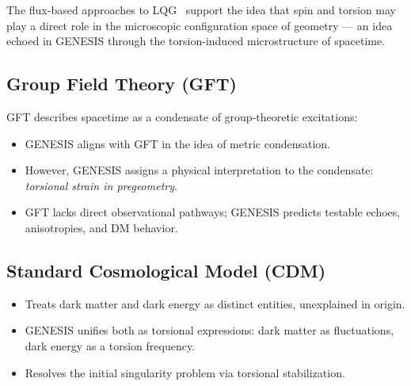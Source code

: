 \documentclass{article}
\begin{document}
The flux-based approaches to LQG~\cite{freidel2011} support the idea that spin and torsion may play a direct role in the microscopic configuration space of geometry — an idea echoed in GENESIS through the torsion-induced microstructure of spacetime.


\medskip
\begin{center}
\end{center}
\medskip


\subsection{Group Field Theory (GFT)} GFT describes spacetime as a condensate of group-theoretic excitations: \begin{itemize} \item GENESIS aligns with GFT in the idea of metric condensation. \item However, GENESIS assigns a physical interpretation to the condensate: \textit{torsional strain in pregeometry}. \item GFT lacks direct observational pathways; GENESIS predicts testable echoes, anisotropies, and DM behavior. \end{itemize}

\medskip
\begin{center}
\end{center}
\medskip


\subsection{Standard Cosmological Model (CDM)} \begin{itemize} \item Treats dark matter and dark energy as distinct entities, unexplained in origin. \item GENESIS unifies both as torsional expressions: dark matter as fluctuations, dark energy as a torsion frequency. \item Resolves the initial singularity problem via torsional stabilization. \end{itemize}
\end{document}
